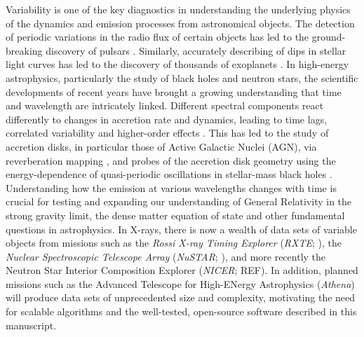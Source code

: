 \documentclass[twocolumn]{aastex62}
\newcommand{\project}[1]{\textsl{#1}\xspace}
\newcommand{\rxte}{\project{RXTE}\xspace}
\newcommand{\nustar}{\project{NuSTAR}\xspace}
\begin{document}
Variability is one of the key diagnostics in understanding the underlying physics of the dynamics and emission processes from astronomical objects. 
The detection of periodic variations in the radio flux of certain objects has led to the ground-breaking discovery of pulsars \citep{hewish1968}. Similarly, accurately describing of dips in stellar light curves has led to the discovery of thousands of exoplanets \citep[e.g.]{charbonneau2000,henry2000,coughlin2016}. 
In high-energy astrophysics, particularly the study of black holes and neutron stars, the scientific developments of recent years have brought a growing understanding that time and wavelength are intricately linked. 
Different spectral components react differently to changes in accretion rate and dynamics, leading to time lags, correlated variability and higher-order effects \citep[for a review, see e.g.][]{uttley2014}. 
This has led to the study of accretion disks, in particular those of Active Galactic Nuclei (AGN), via reverberation mapping \citep[e.g.][]{Bentz2016}, and probes of the accretion disk geometry using the energy-dependence of quasi-periodic oscillations in stellar-mass black holes \citep{ingram2015,ingram2016}. 
Understanding how the emission at various wavelengths changes with time is crucial for testing and expanding our understanding of General Relativity in the strong gravity limit, the dense matter equation of state and other fundamental questions in astrophysics.
In X-rays, there is now a wealth of data sets of variable objects from missions such as the \textit{Rossi X-ray Timing Explorer} (\rxte; \citealt{Jahodaetal96}), the \textit{Nuclear Spectroscopic Telescope Array} (\nustar; \citealt{nustar13}), and more recently the Neutron Star Interior Composition Explorer (\textit{NICER}; REF). In addition, planned missions such as the Advanced Telescope for High-ENergy Astrophysics (\textit{Athena}) will produce data sets of unprecedented size and complexity, motivating the need for scalable algorithms and the well-tested, open-source software described in this manuscript.
\end{document}
